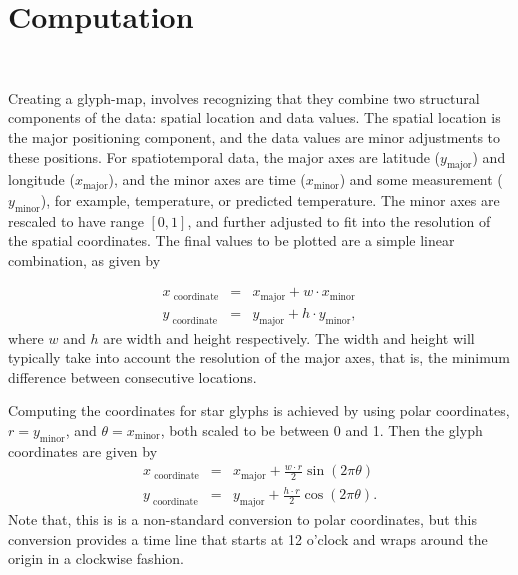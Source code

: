 \documentclass[oneside]{article}
\newcommand\amin{\text{minor}}
\newcommand\amaj{\text{major}}
\begin{document}

\section{Computation}~\label{sec:construction}

Creating a glyph-map, involves recognizing that they combine two structural components of the data: spatial location and data values. The spatial location is the major positioning component, and the data values are minor adjustments to these positions. For spatiotemporal data, the major axes are latitude ($y_{\amaj}$) and longitude ($x_{\amaj}$), and the minor axes are time ($x_{\amin}$) and some measurement ($y_{\amin}$), for example, temperature, or predicted temperature. The minor axes are rescaled to have range $[0, 1]$, and further adjusted to fit into the resolution of the spatial coordinates. The final values to be plotted are a simple linear combination, as given by 

\begin{equation}
\begin{array}{lll}
x_\text{ coordinate}&=& x_{\amaj} + w \cdot x_{\amin}\\
y_\text{ coordinate}&=& y_{\amaj} + h \cdot y_{\amin}, 
\end{array}\label{coords.eqn}
\end{equation}
where $w$ and $h$ are width and height respectively. The width and height will typically take into account the resolution of the major axes, that is, the minimum difference between consecutive locations.

Computing the coordinates for star glyphs is achieved by using polar coordinates,  $r=y_{\amin}$, and $\theta=x_{\amin}$, both scaled to be between 0 and 1. Then the glyph coordinates are given by 
\begin{equation}
\begin{array}{lll}
x_\text{ coordinate}&=& x_{\amaj} + \frac{w \cdot r}{2} \sin(2 \pi \theta) \\
y_\text{ coordinate}&=& y_{\amaj} + \frac{h \cdot r}{2} \cos(2 \pi \theta).
\end{array}\label{coords.polar.eqn}
\end{equation}
Note that, this is is a non-standard conversion to polar coordinates, but this conversion provides a time line that starts at 12 o'clock and wraps around the origin in a clockwise fashion.
\end{document}
